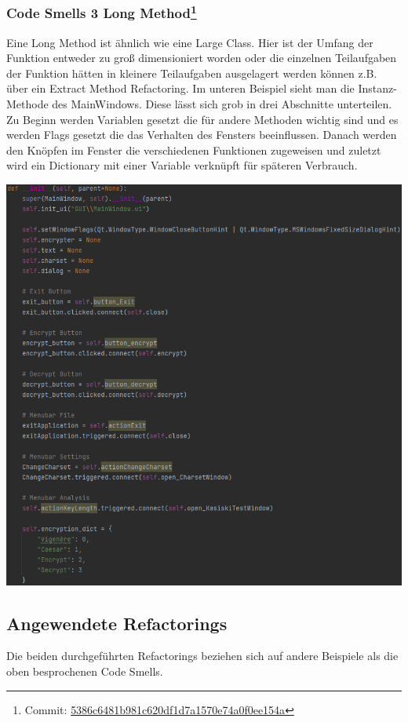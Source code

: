 \documentclass[12pt]{article}
\begin{document}
\subsubsection[Code Smells 3 Long Method]{Code Smells 3 Long Method\protect\footnote{Commit: \href{https://github.com/NicoSchrodt/EncryptionService/commit/5386c6481b981c620df1d7a1570e74a0f0ee154a}{5386c6481b981c620df1d7a1570e74a0f0ee154a}}}
Eine Long Method ist ähnlich wie eine Large Class. Hier ist der Umfang der Funktion entweder zu groß dimensioniert worden oder die einzelnen Teilaufgaben der Funktion hätten in kleinere Teilaufgaben ausgelagert werden können z.B. über ein Extract Method Refactoring. Im unteren Beispiel sieht man die Instanz-Methode des MainWindows. Diese lässt sich grob in drei Abschnitte unterteilen. Zu Beginn werden Variablen gesetzt die für andere Methoden wichtig sind und es werden Flags gesetzt die das Verhalten des Fensters beeinflussen. Danach werden den Knöpfen im Fenster die verschiedenen Funktionen zugeweisen und zuletzt wird ein Dictionary mit einer Variable verknüpft für späteren Verbrauch.
\begin{center}
	\includegraphics[width=15cm]{bilder/CodeSmells2.png}
\end{center}

\subsection{Angewendete Refactorings}
Die beiden durchgeführten Refactorings beziehen sich auf andere Beispiele als die oben besprochenen Code Smells.
\end{document}

